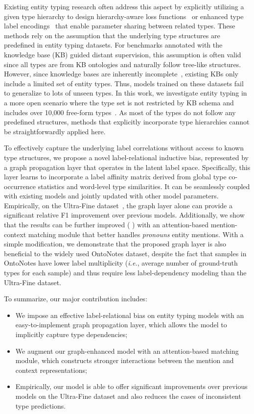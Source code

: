 \documentclass[11pt,a4paper]{article}
\begin{document}
Existing entity typing research often address this aspect by explicitly utilizing a given type hierarchy to design hierarchy-aware loss functions~\cite{ren2016label,xu2018neural} or enhanced type label encodings~\cite{shimaoka2016neural} that enable parameter sharing between related types. These methods rely on the assumption that the underlying type structures are predefined in entity typing datasets. For benchmarks annotated with the knowledge base (KB) guided distant supervision, this assumption is often valid since all types are from KB ontologies and naturally follow tree-like structures. However, since knowledge bases are inherently incomplete~\cite{min2013distant}, existing KBs only include a limited set of entity types. Thus, models trained on these datasets fail to generalize to lots of unseen types. In this work, we investigate entity typing in a more open scenario where the type set is not restricted by KB schema and includes over 10,000 free-form types~\cite{choi2018ultra}. As most of the types do not follow any predefined structures, methods that explicitly incorporate type hierarchies cannot be straightforwardly applied here. 


To effectively capture the underlying label correlations without access to known type structures, we propose a novel label-relational inductive bias, represented by a graph propagation layer that operates in the latent label space. Specifically, this layer learns to incorporate a label affinity matrix derived from global type co-occurrence statistics and word-level type similarities. It can be seamlessly coupled with existing models and jointly updated with other model parameters. Empirically, on the Ultra-Fine dataset~\cite{choi2018ultra}, the graph layer alone can provide a significant  relative F1 improvement over previous models. Additionally, we show that the results can be further improved (  ) with an attention-based mention-context matching module that better handles \textit{pronouns} entity mentions. With a simple modification, we demonstrate that the proposed graph layer is also beneficial to the widely used OntoNotes dataset, despite the fact that samples in OntoNotes have lower label multiplicity (\emph{i.e.}, average number of ground-truth types for each sample) and thus require less label-dependency modeling than the Ultra-Fine dataset. 

To summarize, our major contribution includes:
\begin{itemize}
    \item We impose an effective label-relational bias on entity typing models with an easy-to-implement graph propagation layer, which allows the model to implicitly capture type dependencies;
    \item We augment our graph-enhanced model with an attention-based matching module, which constructs stronger interactions between the mention and context representations;
    \item Empirically, our model is able to offer significant improvements over previous models on the Ultra-Fine dataset and also reduces the cases of inconsistent type predictions.
\end{itemize}
\end{document}
